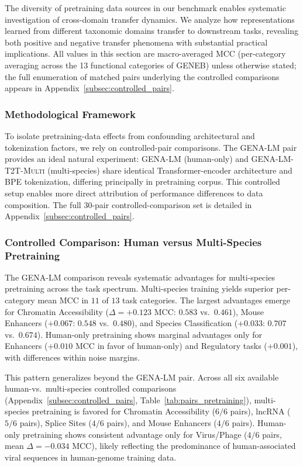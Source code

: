 \documentclass{article}
\theoremstyle{plain}
\theoremstyle{definition}
\theoremstyle{remark}
\begin{document}
The diversity of pretraining data sources in our benchmark enables
systematic investigation of cross-domain transfer dynamics. We
analyze how representations learned from different taxonomic
domains transfer to downstream tasks, revealing both positive and
negative transfer phenomena with substantial practical
implications. All values in this section are macro-averaged MCC
(per-category averaging across the 13 functional categories of
GENEB) unless otherwise stated; the full enumeration of matched
pairs underlying the controlled comparisons appears in
Appendix~\ref{subsec:controlled_pairs}.

\subsubsection{Methodological Framework}

To isolate pretraining-data effects from confounding architectural
and tokenization factors, we rely on controlled-pair comparisons.
The \textsc{GENA-LM} pair provides an ideal natural experiment:
\textsc{GENA-LM} (human-only) and \textsc{GENA-LM-T2T-Multi}
(multi-species) share identical Transformer-encoder architecture
and BPE tokenization, differing principally in pretraining corpus.
This controlled setup enables more direct attribution of performance
differences to data composition. The full 30-pair controlled-comparison
set is detailed in Appendix~\ref{subsec:controlled_pairs}.

\subsubsection{Controlled Comparison: Human versus Multi-Species Pretraining}

The \textsc{GENA-LM} comparison reveals systematic advantages for
multi-species pretraining across the task spectrum. Multi-species
training yields superior per-category mean MCC in $11$ of $13$
task categories. The largest advantages emerge for Chromatin
Accessibility ($\Delta = +0.123$ MCC: $0.583$ vs.\ $0.461$),
Mouse Enhancers ($+0.067$: $0.548$ vs.\ $0.480$), and Species
Classification ($+0.033$: $0.707$ vs.\ $0.674$). Human-only
pretraining shows marginal advantages only for Enhancers
($+0.010$ MCC in favor of human-only) and Regulatory tasks
($+0.001$), with differences within noise margins.

This pattern generalizes beyond the \textsc{GENA-LM} pair. Across
all six available human-vs.\ multi-species controlled comparisons
(Appendix~\ref{subsec:controlled_pairs},
Table~\ref{tab:pairs_pretraining}), multi-species pretraining is
favored for Chromatin Accessibility ($6/6$ pairs), lncRNA
($5/6$ pairs), Splice Sites ($4/6$ pairs), and Mouse Enhancers
($4/6$ pairs). Human-only pretraining shows consistent advantage
only for Virus/Phage ($4/6$ pairs, mean $\Delta = -0.034$ MCC),
likely reflecting the predominance of human-associated viral
sequences in human-genome training data.
\end{document}
